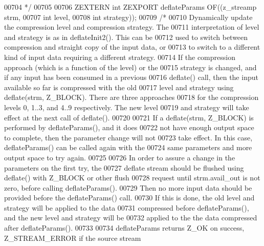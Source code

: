\begin{DoxyCode}
00704 \textcolor{comment}{*/}
00705 
00706 ZEXTERN \textcolor{keywordtype}{int} ZEXPORT deflateParams OF((z\_streamp strm,
00707                                       \textcolor{keywordtype}{int} level,
00708                                       \textcolor{keywordtype}{int} strategy));
00709 \textcolor{comment}{/*}
00710 \textcolor{comment}{     Dynamically update the compression level and compression strategy.  The}
00711 \textcolor{comment}{   interpretation of level and strategy is as in deflateInit2().  This can be}
00712 \textcolor{comment}{   used to switch between compression and straight copy of the input data, or}
00713 \textcolor{comment}{   to switch to a different kind of input data requiring a different strategy.}
00714 \textcolor{comment}{   If the compression approach (which is a function of the level) or the}
00715 \textcolor{comment}{   strategy is changed, and if any input has been consumed in a previous}
00716 \textcolor{comment}{   deflate() call, then the input available so far is compressed with the old}
00717 \textcolor{comment}{   level and strategy using deflate(strm, Z\_BLOCK).  There are three approaches}
00718 \textcolor{comment}{   for the compression levels 0, 1..3, and 4..9 respectively.  The new level}
00719 \textcolor{comment}{   and strategy will take effect at the next call of deflate().}
00720 \textcolor{comment}{}
00721 \textcolor{comment}{     If a deflate(strm, Z\_BLOCK) is performed by deflateParams(), and it does}
00722 \textcolor{comment}{   not have enough output space to complete, then the parameter change will not}
00723 \textcolor{comment}{   take effect.  In this case, deflateParams() can be called again with the}
00724 \textcolor{comment}{   same parameters and more output space to try again.}
00725 \textcolor{comment}{}
00726 \textcolor{comment}{     In order to assure a change in the parameters on the first try, the}
00727 \textcolor{comment}{   deflate stream should be flushed using deflate() with Z\_BLOCK or other flush}
00728 \textcolor{comment}{   request until strm.avail\_out is not zero, before calling deflateParams().}
00729 \textcolor{comment}{   Then no more input data should be provided before the deflateParams() call.}
00730 \textcolor{comment}{   If this is done, the old level and strategy will be applied to the data}
00731 \textcolor{comment}{   compressed before deflateParams(), and the new level and strategy will be}
00732 \textcolor{comment}{   applied to the the data compressed after deflateParams().}
00733 \textcolor{comment}{}
00734 \textcolor{comment}{     deflateParams returns Z\_OK on success, Z\_STREAM\_ERROR if the source stream}

\end{DoxyCode}
